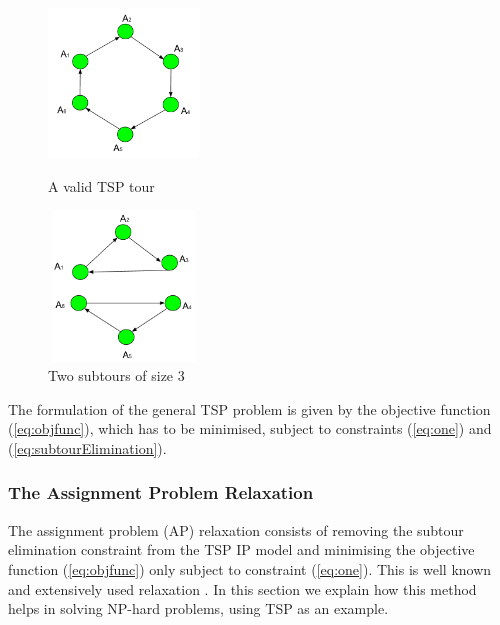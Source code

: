 \documentclass{mprop}
\theoremstyle{definition}
\begin{document}
\begin{figure}
\centering
\begin{minipage}{.5\textwidth}
  \centering
  \includegraphics[width=4cm, height=4cm]{images/valid.png}
  \caption{A valid TSP tour}
  \label{fig:tour}
\end{minipage}%
\begin{minipage}{.5\textwidth}
  \centering
  \includegraphics[width=4cm, height=4cm]{images/invalid.png}
  \caption{Two subtours of size 3}
  \label{fig:subtours}
\end{minipage}
\end{figure}

The formulation of the general TSP problem is given by the objective function (\ref{eq:objfunc}), which has to be minimised, subject to constraints (\ref{eq:one}) and (\ref{eq:subtourElimination}).

\subsubsection{The Assignment Problem Relaxation}

The assignment problem (AP) relaxation consists of removing the subtour elimination constraint from the TSP IP model and minimising the objective function (\ref{eq:objfunc}) only subject to constraint (\ref{eq:one}). This is well known and extensively used relaxation \cite{Fischetti92,Jonker80,Eastman58,Laporte86}. In this section we explain how this method helps in solving NP-hard problems, using TSP as an example.
\end{document}
